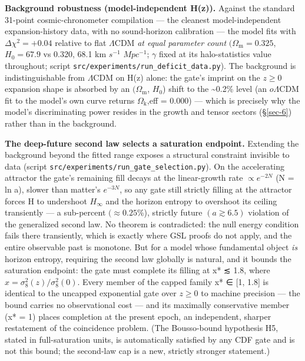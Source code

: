 \documentclass[preprint,12pt]{elsarticle}
\begin{document}
\textbf{Background robustness (model-independent H(z)).} Against the
standard 31-point cosmic-chronometer compilation --- the cleanest
model-independent expansion-history data, with no sound-horizon
calibration --- the model fits with \(\Delta \chi ^{2} = +0.04\)
relative to flat \(\Lambda \mathrm{CDM}\) \emph{at equal parameter
count} \((\Omega _{\mathrm{m}} = 0.325\), \(H_{0} = 67.9\) vs 0.320,
68.1 km \(s^{-1}\) \(Mpc^{-1}\); \(\gamma\) fixed at its halo-statistics
value throughout; script
\texttt{src/\allowbreak experiments/\allowbreak run\_\allowbreak deficit\_\allowbreak data.\allowbreak py}). The background is
indistinguishable from \(\Lambda \mathrm{CDM}\) on H(z) alone: the
gate's imprint on the \(z \geq  0\) expansion shape is absorbed by an
\((\Omega _{\mathrm{m}}\), \(H_{0}\)) shift to the \textasciitilde0.2\%
level (an \(o\Lambda \mathrm{CDM}\) fit to the model's own curve returns
\(\Omega _{\mathrm{k}}\),eff = 0.000) --- which is precisely why the
model's discriminating power resides in the growth and tensor sectors
(§\ref{sec-6}) rather than in the background.

\textbf{The deep-future second law selects a saturation endpoint.}
Extending the background beyond the fitted range exposes a structural
constraint invisible to data (script
\texttt{src/\allowbreak experiments/\allowbreak run\_\allowbreak gate\_\allowbreak selection.\allowbreak py}). On the accelerating
attractor the gate's remaining fill decays at the linear-growth rate
\(\propto  e^{-2N}\) (N = ln a), slower than matter's \(e^{-3N}\), so
any gate still strictly filling at the attractor forces H to undershoot
\(H_\infty\) and the horizon entropy to overshoot its ceiling
transiently --- a sub-percent \((\approx 0.25\)\%), strictly future
\((a \gtrsim  6.5)\) violation of the generalized second law. No theorem
is contradicted: the null energy condition fails there transiently,
which is exactly where GSL proofs do not apply, and the entire
observable past is monotone. But for a model whose fundamental object
\emph{is} horizon entropy, requiring the second law globally is natural,
and it bounds the saturation endpoint: the gate must complete its
filling at x* ≲ 1.8, where
\(x = \sigma _{8}^{2}(z)/\sigma _{8}^{2}(0)\). Every member of the
capped family x* ∈ {[}1, 1.8{]} is identical to the uncapped exponential
gate over \(z \geq  0\) to machine precision --- the bound carries no
observational cost --- and its maximally conservative member (x* = 1)
places completion at the present epoch, an independent, sharper
restatement of the coincidence problem. (The Bousso-bound hypothesis H5,
stated in full-saturation units, is automatically satisfied by any CDF
gate and is not this bound; the second-law cap is a new, strictly
stronger statement.)
\end{document}
